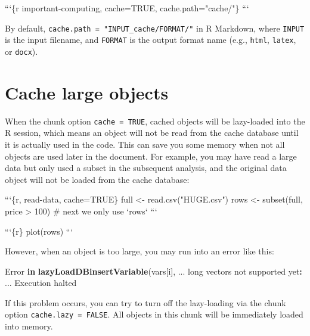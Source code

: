 \documentclass[
  11pt,
]{krantz}
\newenvironment{Shaded}{\begin{snugshade}}{\end{snugshade}}
\newcommand{\BaseNTok}[1]{\textcolor[rgb]{0.06,0.06,0.06}{#1}}
\newcommand{\ControlFlowTok}[1]{\textcolor[rgb]{0.27,0.27,0.27}{\textbf{#1}}}
\newcommand{\KeywordTok}[1]{\textcolor[rgb]{0.27,0.27,0.27}{\textbf{#1}}}
\newcommand{\NormalTok}[1]{#1}
\newcommand{\OperatorTok}[1]{\textcolor[rgb]{0.43,0.43,0.43}{\textbf{#1}}}
\newcommand{\StringTok}[1]{\textcolor[rgb]{0.5,0.5,0.5}{#1}}
\begin{document}
\begin{Shaded}
\begin{Highlighting}[]
\BaseNTok{```\{r important-computing, cache=TRUE, cache.path="cache/"\}}
\BaseNTok{```}
\end{Highlighting}
\end{Shaded}

By default, \texttt{cache.path\ =\ "INPUT\_cache/FORMAT/"} in R Markdown, where \texttt{INPUT} is the input filename, and \texttt{FORMAT} is the output format name (e.g., \texttt{html}, \texttt{latex}, or \texttt{docx}).

\hypertarget{cache-lazy}{%
\section{Cache large objects}\label{cache-lazy}}

When the chunk option \texttt{cache\ =\ TRUE}, cached objects will be lazy-loaded into the R session, which means an object will not be read from the cache database until it is actually used in the code. This can save you some memory when not all objects are used later in the document. For example, you may have read a large data but only used a subset in the subsequent analysis, and the original data object will not be loaded from the cache database:

\begin{Shaded}
\begin{Highlighting}[]
\BaseNTok{```\{r, read-data, cache=TRUE\}}
\BaseNTok{full <- read.csv("HUGE.csv")}
\BaseNTok{rows <- subset(full, price > 100)}
\BaseNTok{# next we only use `rows`}
\BaseNTok{```}

\BaseNTok{```\{r\}}
\BaseNTok{plot(rows)}
\BaseNTok{```}
\end{Highlighting}
\end{Shaded}

However, when an object is too large, you may run into an error like this:

\begin{Shaded}
\begin{Highlighting}[]
\NormalTok{Error }\ControlFlowTok{in} \KeywordTok{lazyLoadDBinsertVariable}\NormalTok{(vars[i], ... }
\NormalTok{  long vectors not supported yet}\OperatorTok{:}\StringTok{ }\NormalTok{...}
\NormalTok{Execution halted}
\end{Highlighting}
\end{Shaded}

If this problem occurs, you can try to turn off the lazy-loading via the chunk option \texttt{cache.lazy\ =\ FALSE}. All objects in this chunk will be immediately loaded into memory.
\end{document}
